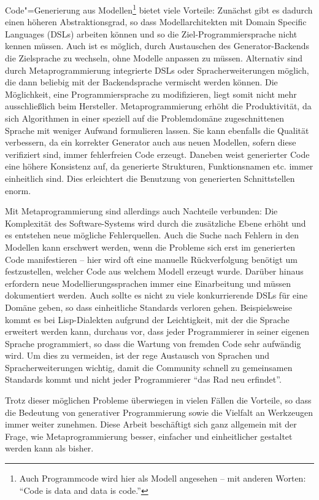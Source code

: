 \documentclass[12pt, a4paper, bibgerm]{scrbook}
\newcommand{\cgen}{Code"=Generierung}
\newcommand{\mprog}{Metaprogrammierung}
\begin{document}
\cgen{} aus Modellen\footnote{Auch Programmcode wird hier als Modell
  angesehen -- mit anderen Worten: "`Code is data and data is code."'}
bietet viele Vorteile: Zunächst gibt es dadurch einen höheren
Abstraktionsgrad, so dass Modellarchitekten mit Domain Specific
Languages (DSLs) arbeiten können und so die Ziel-Programmiersprache
nicht kennen müssen. Auch ist es möglich, durch Austauschen des
Generator-Backends die Zielsprache zu wechseln, ohne Modelle anpassen zu
müssen. Alternativ sind durch \mprog{} integrierte DSLs oder
Spracherweiterungen möglich, die dann beliebig mit der Backendsprache
vermischt werden können. Die Möglichkeit, eine Programmiersprache zu
modifizieren, liegt somit nicht mehr ausschließlich beim
Hersteller. \mprog{} erhöht die Produktivität, da sich Algorithmen in
einer speziell auf die Problemdomäne zugeschnittenen Sprache mit weniger
Aufwand formulieren lassen. Sie kann ebenfalls die Qualität verbessern, da ein
korrekter Generator auch aus neuen Modellen, sofern diese verifiziert
sind, immer fehlerfreien Code erzeugt. Daneben weist generierter Code eine
höhere Konsistenz auf, da generierte Strukturen, Funktionsnamen
etc. immer einheitlich sind. Dies erleichtert die Benutzung von
generierten Schnittstellen enorm.

Mit \mprog{} sind allerdings auch Nachteile verbunden: Die Komplexität des
Software-Systems wird durch die zusätzliche Ebene erhöht und es
entstehen neue mögliche Fehlerquellen. Auch die Suche nach Fehlern in
den Modellen kann erschwert werden, wenn die Probleme sich erst im
generierten Code manifestieren -- hier wird oft eine manuelle
Rückverfolgung benötigt um festzustellen, welcher Code aus welchem
Modell erzeugt wurde. Darüber hinaus erfordern neue
Modellierungssprachen immer eine Einarbeitung und müssen dokumentiert
werden. Auch sollte es nicht zu viele konkurrierende DSLs für eine
Domäne geben, so dass einheitliche Standards verloren
gehen. Beispielsweise kommt es bei Lisp-Dialekten \cite{Lisp} aufgrund
der Leichtigkeit, mit der die Sprache erweitert werden kann, durchaus
vor, dass jeder Programmierer in seiner eigenen Sprache programmiert, so
dass die Wartung von fremden Code sehr aufwändig wird. Um dies zu
vermeiden, ist der rege Austausch von Sprachen und Spracherweiterungen
wichtig, damit die Community schnell zu gemeinsamen Standards kommt
und nicht jeder Programmierer "`das Rad neu erfindet"'.

Trotz dieser möglichen Probleme überwiegen in vielen Fällen die
Vorteile, so dass die Bedeutung von generativer Programmierung sowie die
Vielfalt an Werkzeugen immer weiter zunehmen. Diese Arbeit beschäftigt
sich ganz allgemein mit der Frage, wie \mprog{} besser, einfacher und
einheitlicher gestaltet werden kann als bisher.
\end{document}
